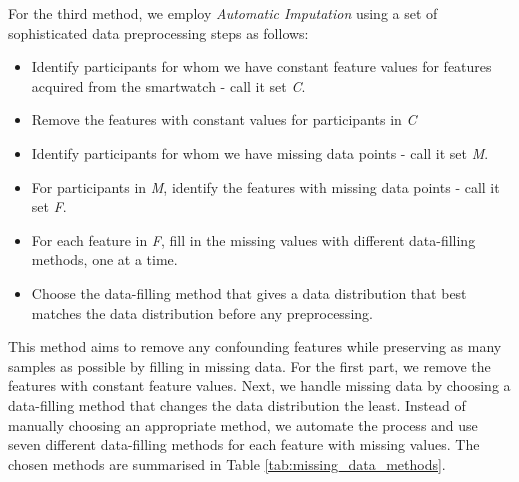 For the third method, we employ \emph{Automatic Imputation} using a set of sophisticated data preprocessing steps as follows:
\begin{itemize}
 \item Identify participants for whom we have constant feature values for features acquired from the smartwatch - call it set \emph{C}.
 \item Remove the features with constant values for participants in \emph{C}
 \item Identify participants for whom we have missing data points - call it set \emph{M}.
 \item For participants in \emph{M}, identify the features with missing data points - call it set \emph{F}.
 \item For each feature in \emph{F}, fill in the missing values with different data-filling methods, one at a time.
 \item Choose the data-filling method that gives a data distribution that best matches the data distribution before any preprocessing.
\end{itemize}

This method aims to remove any confounding features while preserving as many samples as possible by filling in missing data. For the first part, we remove the features with constant feature values. Next, we handle missing data by choosing a data-filling method that changes the data distribution the least. Instead of manually choosing an appropriate method, we automate the process and use seven different data-filling methods for each feature with missing values. The chosen methods are summarised in Table \ref{tab:missing_data_methods}. 


